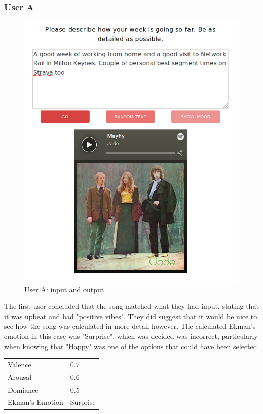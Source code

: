 \subsubsection{User A}

\begin{figure}[h]
\centering
\includegraphics[scale=0.4]{implementation/malc-user.png}
\caption{User A: input and output}
\label{user:1}
\end{figure}

The first user concluded that the song matched what they had input, stating that it was upbeat and had "positive vibes". They did suggest that it would be nice to see how the song was calculated in more detail however. The calculated Ekman's emotion in this case was "Surprise", which was decided was incorrect, particularly when knowing that "Happy" was one of the options that could have been selected.

\begin{table}[h]
\centering
\begin{tabular}{|l|l|}
\hline
 Valence &  0.7\\
 Arousal &  0.6\\
 Domiance &  0.5\\
 Ekman's Emotion &  Surprise\\ \hline
\end{tabular}
\end{table}

